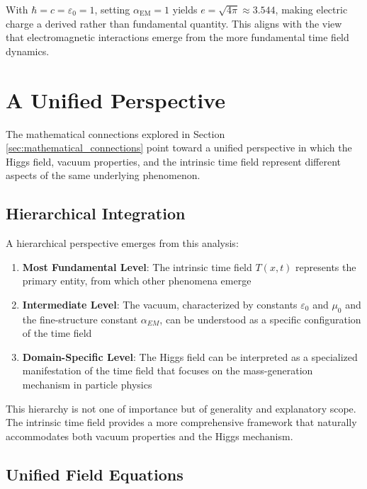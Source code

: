 \documentclass[12pt,a4paper]{article}
\newcommand{\Tfieldt}{T(x,t)}
\newcommand{\alphaEM}{\alpha_{\text{EM}}}
\begin{document}
	With $\hbar = c = \varepsilon_0 = 1$, setting $\alphaEM = 1$ yields $e = \sqrt{4\pi} \approx 3.544$, making electric charge a derived rather than fundamental quantity. This aligns with the view that electromagnetic interactions emerge from the more fundamental time field dynamics.
	
	\section{A Unified Perspective}
	\label{sec:unified_perspective}
	
	The mathematical connections explored in Section \ref{sec:mathematical_connections} point toward a unified perspective in which the Higgs field, vacuum properties, and the intrinsic time field represent different aspects of the same underlying phenomenon.
	
	\subsection{Hierarchical Integration}
	\label{subsec:hierarchical_integration}
	
	A hierarchical perspective emerges from this analysis:
	
	\begin{enumerate}
		\item \textbf{Most Fundamental Level}: The intrinsic time field $\Tfieldt$ represents the primary entity, from which other phenomena emerge
		
		\item \textbf{Intermediate Level}: The vacuum, characterized by constants $\varepsilon_0$ and $\mu_0$ and the fine-structure constant $\alpha_{EM}$, can be understood as a specific configuration of the time field
		
		\item \textbf{Domain-Specific Level}: The Higgs field can be interpreted as a specialized manifestation of the time field that focuses on the mass-generation mechanism in particle physics
	\end{enumerate}
	
	This hierarchy is not one of importance but of generality and explanatory scope. The intrinsic time field provides a more comprehensive framework that naturally accommodates both vacuum properties and the Higgs mechanism.
	
	\subsection{Unified Field Equations}
	\label{subsec:unified_equations}
	
\end{document}
